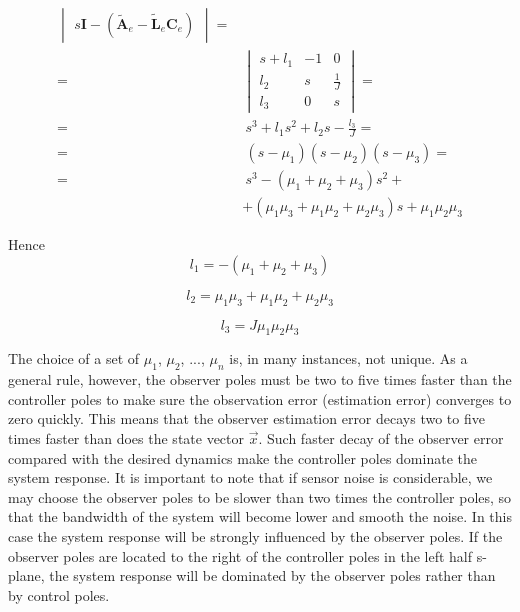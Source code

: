 \documentclass[11pt,a4paper,oneside]{book}
\numberwithin{equation}{section}
\theoremstyle{it}
\theoremstyle{definition}
\begin{document}
	\begin{equation} \label{example_1_eq11}
		\begin{split}
			\begin{vmatrix}
				s\mathbf{I}-(\tilde{\mathbf{A}}_e-\tilde{\mathbf{L}}_e\mathbf{C}_e)
			\end{vmatrix} = \\[6pt]
			= & 
			\begin{vmatrix}
				s+l_1 & -1 & 0 \\[6pt]
				l_2 & s & \frac{1}{J} \\[6pt]
				l_3 & 0 & s
			\end{vmatrix} = \\[6pt]
			= & \: s^3 + l_1s^2+l_2s-\frac{l_3}{J} = \\[6pt]
			= & \: (s-\mu_1)(s-\mu_2)(s-\mu_3) = \\[6pt]
			= & \:s^3-(\mu_1+\mu_2+\mu_3)s^2+ \\[6pt]
			& + (\mu_1\mu_3+\mu_1\mu_2+\mu_2\mu_3)s+\mu_1\mu_2\mu_3
		\end{split}
	\end{equation}
	
	Hence
	\begin{equation}
		l_1 = -(\mu_1+\mu_2+\mu_3)
	\end{equation}
	
	\begin{equation}
		l_2 = \mu_1\mu_3+\mu_1\mu_2+\mu_2\mu_3
	\end{equation}
	
	\begin{equation}
		l_3 = J\mu_1\mu_2\mu_3
	\end{equation}
	
	The choice of a set of $\mu_1$, $\mu_2$, $...$, $\mu_n$ is, in many instances, not unique. As a general rule, however, the observer poles must be two to five times faster than the controller poles to make sure the observation error (estimation error) converges to zero quickly. This means that the observer estimation error decays two to five times faster than does the state vector $\vec x$. Such faster decay of the observer error compared with the desired dynamics make the controller poles dominate the system response. It is important to note that if sensor noise is considerable, we may choose the observer poles to be slower than two times the controller poles, so that the bandwidth of the system will become lower and smooth the noise. In this case the system response will be strongly influenced by the observer poles. If the observer poles are located to the right of the controller poles in the left half s-plane, the system response will be dominated by the observer poles rather than by control poles.
	
\end{document}
